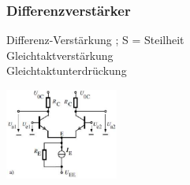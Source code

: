          \subsubsection{Differenzverst\"arker}
             \begin{minipage}[T]{15cm}
                 Differenz-Verst\"arkung
                 \hspace{8.4mm} ; S = Steilheit\\
                 Gleichtaktverst\"arkung
                 \hspace{8.1mm}\\
                 Gleichtaktunterdr\"uckung
                 \hspace{3.8mm}
             \end{minipage}
             \begin{minipage}{4cm}
                 \includegraphics[height=3cm]{./bilder/BipTraDiffAmp.png}
             \end{minipage}\\
             
